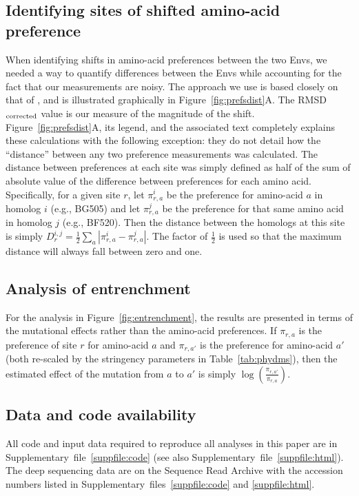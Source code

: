 \documentclass[9pt]{elife}
\begin{document}
\subsection{Identifying sites of shifted amino-acid preference}
When identifying shifts in amino-acid preferences between the two Envs, we needed a way to quantify differences between the Envs while accounting for the fact that our measurements are noisy.
The approach we use is based closely on that of \citet{doud2015site}, and is illustrated graphically in Figure~\ref{fig:prefsdist}A.
The RMSD$_{\rm{corrected}}$ value is our measure of the magnitude of the shift.
Figure~\ref{fig:prefsdist}A, its legend, and the associated text completely explains these calculations with the following exception: they do not detail how the ``distance'' between any two preference measurements was calculated. 
The distance between preferences at each site was simply defined as half of the sum of absolute value of the difference between preferences for each amino acid.
Specifically, for a given site $r$, let $\pi_{r,a}^{i}$ be the preference for amino-acid $a$ in homolog $i$ (e.g., BG505) and let $\pi_{r,a}^{j}$ be the preference for that same amino acid in homolog $j$ (e.g., BF520). 
Then the distance between the homologs at this site is simply $D_{r}^{i,j} = \frac{1}{2}\sum_{a}|\pi_{r,a}^{i}-\pi_{r,a}^{j}|$.
The factor of $\frac{1}{2}$ is used so that the maximum distance will always fall between zero and one.

\subsection{Analysis of entrenchment}
For the analysis in Figure~\ref{fig:entrenchment}, the results are presented in terms of the mutational effects rather than the amino-acid preferences. 
If $\pi_{r,a}$ is the preference of site $r$ for amino-acid $a$ and $\pi_{r,a'}$ is the preference for amino-acid $a'$ (both re-scaled by the stringency parameters in Table~\ref{tab:phydms}), then the estimated effect of the mutation from $a$ to $a'$ is simply $\log\left(\frac{\pi_{r,a'}}{\pi_{r,a}}\right)$.

\subsection{Data and code availability}
All code and input data required to reproduce all analyses in this paper are in Supplementary~file~\ref{suppfile:code} (see also Supplementary~file~\ref{suppfile:html}).
The deep sequencing data are on the Sequence Read Archive with the accession numbers listed in Supplementary~files~\ref{suppfile:code} and \ref{suppfile:html}.
\end{document}
